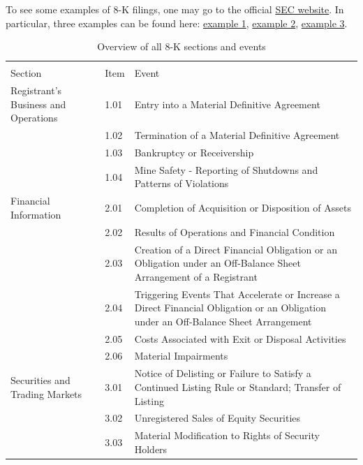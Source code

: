 \documentclass{article}
\begin{document}
	To see some examples of 8-K filings, one may go to the official  \href{https://www.sec.gov/cgi-bin/browse-edgar?company=&CIK=&type=8-K&owner=include&count=40&action=getcurrent}{SEC website}. In particular, three examples can be found here: \href{https://www.sec.gov/ix?doc=/Archives/edgar/data/1339947/000119312519299728/d840037d8k.htm}{example 1}, \href{https://www.sec.gov/Archives/edgar/data/883975/000149315219018330/form8-k.htm}{example 2}, \href{https://www.sec.gov/Archives/edgar/data/1419275/000118518519001650/greenbox20191125_8k.htm}{example 3}.
	
	\begin{table}[h!]
	\centering
	\caption{Overview of all 8-K sections and events}
	\label{table:8kevents}
	
	\begin{tabularx}{\textwidth}{|X|l|X|}
		\toprule
		&      &                                   \\
		Section & Item & Event \\
		\midrule
		Registrant's Business and Operations & 1.01 & Entry into a Material Definitive Agreement \\
		& 1.02 & Termination of a Material Definitive Agreement \\
		& 1.03 & Bankruptcy or Receivership \\
		& 1.04 & Mine Safety - Reporting of Shutdowns and Patterns of Violations \\
		Financial Information & 2.01 & Completion of Acquisition or Disposition of Assets \\
		& 2.02 & Results of Operations and Financial Condition \\
		& 2.03 & Creation of a Direct Financial Obligation or an Obligation under an Off-Balance Sheet Arrangement of a Registrant \\
		& 2.04 & Triggering Events That Accelerate or Increase a Direct Financial Obligation or an Obligation under an Off-Balance Sheet Arrangement \\
		& 2.05 & Costs Associated with Exit or Disposal Activities \\
		& 2.06 & Material Impairments \\
		Securities and Trading Markets & 3.01 & Notice of Delisting or Failure to Satisfy a Continued Listing Rule or Standard; Transfer of Listing \\
		& 3.02 & Unregistered Sales of Equity Securities \\
		& 3.03 & Material Modification to Rights of Security Holders \\

\end{tabularx}
\end{table}
\end{document}
